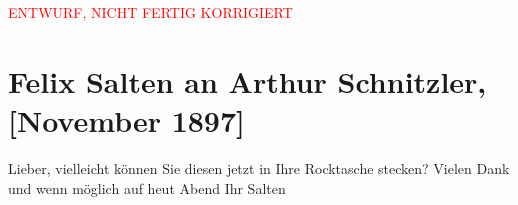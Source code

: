 
\begin{center}
            \textcolor{red}{ENTWURF, NICHT FERTIG KORRIGIERT}
                      \end{center}
            
         \renewcommand{\erwaehnteOrte}{Orte: Wien}
         \renewcommand{\erwaehnteWerke}{}
               \section[Felix Salten an Arthur Schnitzler, {[}November 1897{]}]{ Felix Salten an Arthur Schnitzler, {[}November 1897{]}}\nopagebreak{}\rehead{ }\begin{ledgroupsized}[t]{13cm}\normalsize\beginnumbering \toendnotes[C]{\smallbreak\pagebreak[2]} 
\toendnotes[C]{\smallbreak}\pstart
           \noindent{}{\pb} Lieber, vielleicht können Sie diesen \label{K_L03275-1v}\label{K_L03275-1h} jetzt in Ihre Rocktasche stecken? \pend
           \pstart
           Vielen Dank und wenn möglich auf heut Abend \pend
           \pstart  Ihr \spacefill\mbox{Salten}\pend{}
         
         \endnumbering{}\end{ledgroupsized}\begin{anhang}\end{anhang}\newcommand{\dateiname}{L03275}\newcommand{\titel}{Felix Salten an Arthur Schnitzler, [November 1897]}\newcommand{\editorInnen}{Martin Anton Müller und Laura Untner}
      